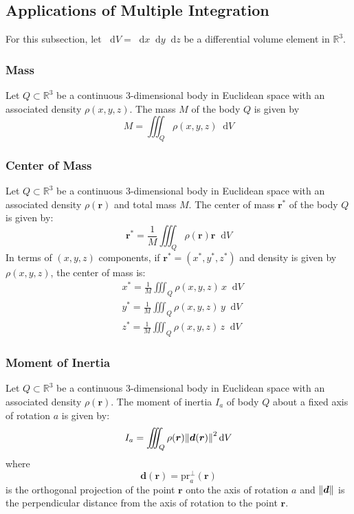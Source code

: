 \documentclass[11pt, a4paper]{article}
\newcommand{\diff}{\mathop{}\!\mathrm{d}} %
\begin{document}
\subsection{Applications of Multiple Integration}
For this subsection, let $ \diff V =  \diff x \diff y \diff z $ be a differential volume element in $ \mathbb{R}^{3} $.

\subsubsection{Mass}
Let $ Q \subset \mathbb{R}^3 $ be a continuous 3-dimensional body in Euclidean space with an associated density $ \rho (x, y, z) $. The mass $ M $ of the body $ Q $ is given by
\begin{equation*}
	M = \iiint_{Q} \rho (x, y, z) \diff V
\end{equation*}

\subsubsection{Center of Mass}
Let $ Q \subset \mathbb{R}^3 $ be a continuous 3-dimensional body in Euclidean space with an associated density $ \rho (\bm{r}) $ and total mass $ M $. The center of mass $ \bm{r}^{*} $ of the body $ Q $ is given by:
\begin{equation*}
\bm{r}^{*} = \frac{1}{M} \iiint_{Q} \rho (\bm{r}) \bm{r} \diff V
\end{equation*}
In terms of $ (x, y, z) $ components, if $ \bm{r}^{*} = (x^{*}, y^{*}, z^{*}) $ and density is given by $ \rho (x, y, z) $, the center of mass is:
\begin{align*}
	& x^{*} = \frac{1}{M} \iiint_Q \rho (x, y, z) \, x \diff V \\[1.5ex]
	& y^{*} = \frac{1}{M} \iiint_Q \rho (x, y, z) \, y \diff V \\[1.5ex]
	& z^{*} = \frac{1}{M} \iiint_Q \rho (x, y, z) \, z \diff V 
\end{align*}

\subsubsection{Moment of Inertia}
Let $ Q \subset \mathbb{R}^3 $ be a continuous 3-dimensional body in Euclidean space with an associated density $ \rho (\bm{r}) $. The moment of inertia $ I_a $ of body $ Q $ about a fixed axis of rotation $ a $ is given by:
\begin{equation*}
	I_a = \iiint_{Q} \rho (\bm{r}) \norm{\bm{d}(\bm{r})}^2 \diff V
\end{equation*}
where 
\begin{equation*}
\bm{d}(\bm{r}) = \text{pr}_{a}^{\perp}(\bm{r})
\end{equation*}
is the orthogonal projection of the point $ \bm{r} $ onto the axis of rotation $ a $ and $ \norm{\bm{d}} $ is the perpendicular distance from the axis of rotation to the point $ \bm{r} $. 
\end{document}

